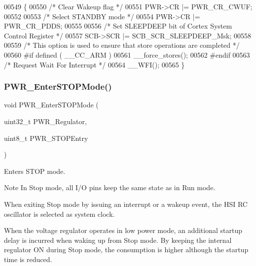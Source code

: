 \begin{DoxyCode}
00549 \{
00550   \textcolor{comment}{/* Clear Wakeup flag */}
00551   PWR->CR |= PWR_CR_CWUF;
00552   
00553   \textcolor{comment}{/* Select STANDBY mode */}
00554   PWR->CR |= PWR_CR_PDDS;
00555   
00556   \textcolor{comment}{/* Set SLEEPDEEP bit of Cortex System Control Register */}
00557   SCB->SCR |= SCB\_SCR\_SLEEPDEEP\_Msk;
00558   
00559 \textcolor{comment}{/* This option is used to ensure that store operations are completed */}
00560 \textcolor{preprocessor}{#if defined ( \_\_CC\_ARM   )}
00561   \_\_force\_stores();
00562 \textcolor{preprocessor}{#endif}
00563   \textcolor{comment}{/* Request Wait For Interrupt */}
00564   \_\_WFI();
00565 \}
\end{DoxyCode}
\mbox{\label{group__PWR__Group6_ga694676ac06a9baf50eae45adae0118ab}} 
\subsubsection{P\+W\+R\+\_\+\+Enter\+S\+T\+O\+P\+Mode()}
{\footnotesize\ttfamily void P\+W\+R\+\_\+\+Enter\+S\+T\+O\+P\+Mode (\begin{DoxyParamCaption}\item[{uint32\+\_\+t}]{P\+W\+R\+\_\+\+Regulator,  }\item[{uint8\+\_\+t}]{P\+W\+R\+\_\+\+S\+T\+O\+P\+Entry }\end{DoxyParamCaption})}



Enters S\+T\+OP mode. 

\begin{DoxyNote}{Note}
In Stop mode, all I/O pins keep the same state as in Run mode. 

When exiting Stop mode by issuing an interrupt or a wakeup event, the H\+SI RC oscillator is selected as system clock. 

When the voltage regulator operates in low power mode, an additional startup delay is incurred when waking up from Stop mode. By keeping the internal regulator ON during Stop mode, the consumption is higher although the startup time is reduced.
\end{DoxyNote}

